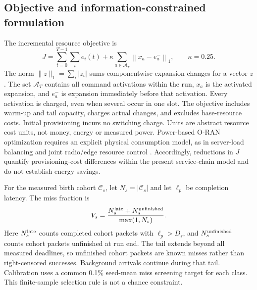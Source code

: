 \documentclass{IEEEoj}
\newcommand{\norm}[1]{\left\lVert#1\right\rVert_1}
\begin{document}
\subsection{Objective and information-constrained formulation}
The incremental resource objective is
\begin{equation}
 J=\sum_{t=0}^{T-1}\sum_i e_i(t)
 +\kappa\sum_{a\in\mathcal A_T}\norm{x_a-e_a^-},\qquad\kappa=0.25.\label{eq:cost}
\end{equation}
The norm $\lVert z\rVert_1=\sum_i|z_i|$ sums componentwise expansion changes for a vector $z$. The set $\mathcal A_T$ contains all command activations within the run, $x_a$
is the activated expansion, and $e_a^-$ is expansion immediately before that
activation. Every activation is charged, even when several occur in one slot.
The objective includes warm-up and tail capacity, charges actual changes, and
excludes base-resource costs. Initial provisioning incurs no switching charge.
Units are abstract resource cost units, not money, energy or measured power. Power-based O-RAN optimization requires an explicit physical consumption model, as in server-load balancing \cite{alkarawi2024} and joint radio/edge resource control \cite{alkarawi2025}. Accordingly, reductions in $J$ quantify provisioning-cost differences within the present service-chain model and do not establish energy savings.

For the measured birth cohort $\mathcal C_s$, let $N_s=|\mathcal C_s|$ and let
$\ell_p$ be completion latency. The miss fraction is
\begin{equation}
V_s=\frac{N_s^{\rm late}+N_s^{\rm unfinished}}{\max(1,N_s)}.
\label{eq:miss}
\end{equation}
Here $N_s^{\rm late}$ counts completed cohort packets with $\ell_p>D_s$, and $N_s^{\rm unfinished}$ counts cohort packets unfinished at run end. The tail extends beyond all measured deadlines, so unfinished cohort packets
are known misses rather than right-censored successes. Background arrivals
continue during that tail. Calibration uses a common 0.1\% seed-mean miss screening target for each
class. This finite-sample selection rule is not a chance constraint.
\end{document}
